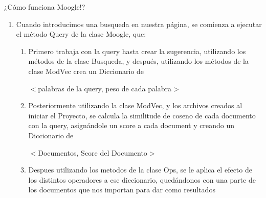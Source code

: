 \begin{frame}
    \centering
    {\large ¿Cómo funciona Moogle!? \par}
    \begin{enumerate}
        \item Cuando introducimos una busqueda en
              nuestra página, se comienza a ejecutar el
              método Query de la clase Moogle, que:

              \begin{enumerate}
                  \item Primero trabaja con la query hasta crear
                        la sugerencia, utilizando los métodos de la
                        clase Busqueda, y 	después, utilizando los
                        métodos de la clase ModVec crea un
                        Diccionario de

                        $<$palabras de la query, peso de cada palabra$>$
                  \item Posteriormente utilizando la clase ModVec,
                        y los archivos creados al iniciar el Proyecto,
                        se calcula la similitude de coseno de cada
                        documento con la query, asignándole un score a
                        cada document y creando un Diccionario de

                        $<$Documentos, Score del Documento$>$

                  \item Despues utilizando los metodos de la clase
                        Ops, se le aplica el efecto de los distintos
                        operadores a ese 	diccionario, quedándonos
                        con una parte de los documentos que nos
                        importan para dar como resultados

              \end{enumerate}
    \end{enumerate}



\end{frame}

